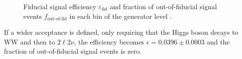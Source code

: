 \begin{figure}[htb]
\centering
{}
\caption{Fiducial signal efficiency $\varepsilon_\mathrm{fid}$ and fraction of out-of-fiducial signal events $f_{\text{out-of-fid}}$ in each bin of the generator level \pth.\label{fig:sel_eff}}
\end{figure}

If a wider acceptance is defined, only requiring that the Higgs boson decays to WW and then to $2\ell2\nu$, the efficiency becomes $\epsilon=0.0396\pm{0.0003}$ and the fraction of out-of-fiducial signal events is zero. 





